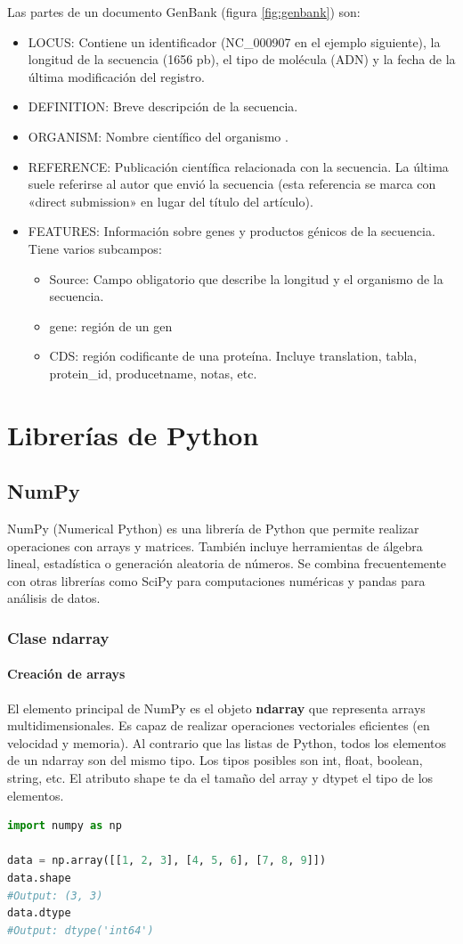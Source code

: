 Las partes de un documento GenBank (figura \ref{fig:genbank}) son:
\begin{itemize}
\item LOCUS: Contiene un identificador (NC\_000907 en el ejemplo siguiente), la longitud de la secuencia (1656 pb), el tipo de molécula (ADN) y la fecha de la última modificación del registro.
\item DEFINITION: Breve descripción de la secuencia.
\item ORGANISM: Nombre científico del organismo .
\item REFERENCE: Publicación científica relacionada con la secuencia. La última suele referirse al autor que envió la secuencia (esta referencia se marca con «direct submission» en lugar del título del artículo).
\item FEATURES: Información sobre genes y productos génicos de la secuencia. Tiene varios subcampos:
\begin{itemize}
\item Source: Campo obligatorio que describe la longitud y el organismo de la secuencia.
\item gene: región de un gen
\item CDS: región codificante de una proteína. Incluye translation, tabla, protein\_id, producetname, notas, etc.
\end{itemize}
\end{itemize}

\section{Librerías de Python}
\subsection{NumPy}
NumPy (Numerical Python) es una librería de Python que permite realizar operaciones con arrays y matrices. También incluye herramientas de álgebra lineal, estadística o generación aleatoria de números. Se combina frecuentemente con otras librerías como SciPy para computaciones numéricas y pandas para análisis de datos.

\subsubsection{Clase ndarray}
\paragraph{Creación de arrays}
El elemento principal de NumPy es el objeto \textbf{ndarray} que representa arrays multidimensionales. Es capaz de realizar operaciones vectoriales eficientes (en velocidad y memoria). Al contrario que las listas de Python, todos los elementos de un ndarray son del mismo tipo. Los tipos posibles son int, float, boolean, string, etc. El atributo shape te da el tamaño del array y dtypet el tipo de los elementos.
\begin{lstlisting}[language=Python]
import numpy as np

data = np.array([[1, 2, 3], [4, 5, 6], [7, 8, 9]])
data.shape 
#Output: (3, 3)
data.dtype
#Output: dtype('int64')
\end{lstlisting}

